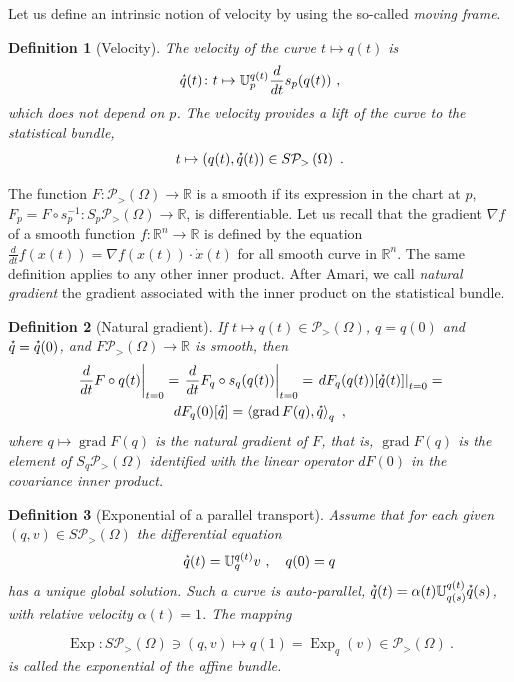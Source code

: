 \documentclass[axioms,article,submit,pdftex,moreauthors]{Definitions/mdpi}
\theoremstyle{plain}
\newtheorem{mydef}{Definition}
\theoremstyle{remark}
\newcommand{\Expat}[2]{\Exp_{#1}\left(#2\right)}
\newcommand{\Exp}{\operatorname{Exp}}
\newcommand{\Grad}{\operatorname{grad}}
\newcommand{\derivby}[1]{\frac{d}{d#1}}
\newcommand{\expbundleat}[1]{S\pdensitieson{#1}}
\newcommand{\expfibreat}[2]{S_{#1}\pdensitieson{#2}}
\newcommand{\pdensitieson}[1]{\mathcal P_{>}\left(#1\right)}
\newcommand{\reals}{\mathbb{R}}
\newcommand{\scalarat}[3]{\left\langle#2,#3\right\rangle_{#1}}
\newcommand{\transport}[2]{{\mathbb U} _ {#1} ^ {#2}}
\newcommand{\velocity}[1]{\accentset{\star}{#1}}
\begin{document}
Let us define an intrinsic notion of velocity by using the so-called \emph{moving frame}.

\begin{mydef}[Velocity] The \emph{velocity} of the curve $t \mapsto q(t)$ is
\begin{equation*}
  \velocity q(t) \colon  t \mapsto \transport p {q(t)} \derivby t s_p(q(t)) \ ,
\end{equation*}
which does not depend on $p$. The velocity provides a lift of the curve to the statistical bundle,
\begin{equation*}
    t \mapsto (q(t),\velocity q(t)) \in \expbundleat\Omega \ .
\end{equation*}
\end{mydef}

The function $F \colon \pdensitieson\Omega \to \reals$ is a smooth if its expression in the chart at $p$, $F_p = F \circ s_p^{-1} \colon \expfibreat p \Omega \to \reals$, is differentiable. Let us recall that the gradient $\nabla f$ of a smooth function $f \colon \reals^n \to \reals$ is defined by the equation $\derivby t f(x(t)) = \nabla f(x(t)) \cdot \dot x(t)$ for all smooth curve in $\reals^n$. The same definition applies to any other inner product. After Amari, we call \emph{natural gradient} the gradient associated with the inner product on the statistical bundle.

\begin{mydef}[Natural gradient] If $ t \mapsto q(t) \in \pdensitieson\Omega$, $q= q(0)$ and $\velocity q = \velocity q(0)$, and $F \pdensitieson\Omega \to \reals$ is smooth, then
\begin{multline}
    \label{eq:natural-gradient}
    \left. \derivby t F\circ q(t) \right|_{t=0} = \left. \derivby t F_q \circ s_q(q(t)) \right|_{t=0} = \left. dF_q(q(t))[\velocity q(t)] \right|_{t=0} = \\ dF_q(0) [\velocity q] = \scalarat q {\Grad F(q)} {\velocity q} \ , \end{multline}
where $q \mapsto \Grad F(q)$ is the \emph{natural gradient} of $F$, that is, $\Grad F(q)$ is the element of $\expfibreat q \Omega$ identified with the linear operator $dF(0)$ in the covariance inner product.
\end{mydef}

\begin{mydef}[Exponential of a parallel transport] \label{def:affine-exponential} Assume that for each given $(q,v) \in \expbundleat\Omega$ the differential equation
\begin{equation*}
    \velocity q(t) = \transport q {q(t)} v \ , \quad q(0)=q  
\end{equation*}
has a unique global solution. Such a curve is \emph{auto-parallel}, $\velocity q(t) = \alpha(t) \transport {q(s)} {q(t)} \velocity q(s)$, with \emph{relative velocity} $\alpha(t) = 1$. The mapping

\begin{equation*}
\Exp \colon  \expbundleat\Omega \ni  (q,v) \mapsto q(1) =  \Expat q v \in \pdensitieson\Omega \ .
\end{equation*}
is called the \emph{exponential} of the affine bundle.
\end{mydef}
\end{document}
